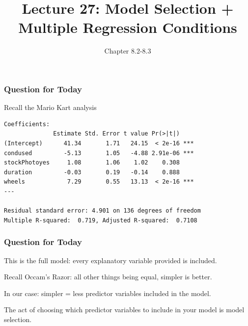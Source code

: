 \documentclass[handout]{beamer}
\title{Lecture 27: Model Selection + Multiple Regression Conditions}
\author{Chapter 8.2-8.3}
\date{}
\newcommand{\blue}[1]{\textcolor{blue2}{#1}}
\begin{document}
\begin{frame}
\titlepage
\end{frame}


\begin{frame}[fragile]
\frametitle{Question for Today}
Recall the Mario Kart analysis

\begin{small}
\begin{verbatim}
Coefficients:
              Estimate Std. Error t value Pr(>|t|)    
(Intercept)      41.34       1.71   24.15  < 2e-16 ***
condused         -5.13       1.05   -4.88 2.91e-06 ***
stockPhotoyes     1.08       1.06    1.02    0.308    
duration         -0.03       0.19   -0.14    0.888    
wheels            7.29       0.55   13.13  < 2e-16 ***
---

Residual standard error: 4.901 on 136 degrees of freedom
Multiple R-squared:  0.719,	Adjusted R-squared:  0.7108 
\end{verbatim}
\end{small}

\end{frame}


\begin{frame}[fragile]
\frametitle{Question for Today}

%
%
This is the \blue{full model}:  every explanatory variable provided is included.

\pause\vspace{0.5cm}

Recall Occam's Razor: \blue{all other things being equal, simpler is better}.  

\pause\vspace{0.5cm}

In our case:  simpler = less predictor variables included in the model.

\pause\vspace{0.5cm}

The act of choosing which predictor variables to include in your model is \blue{model selection}.

\end{frame}
\end{document}
